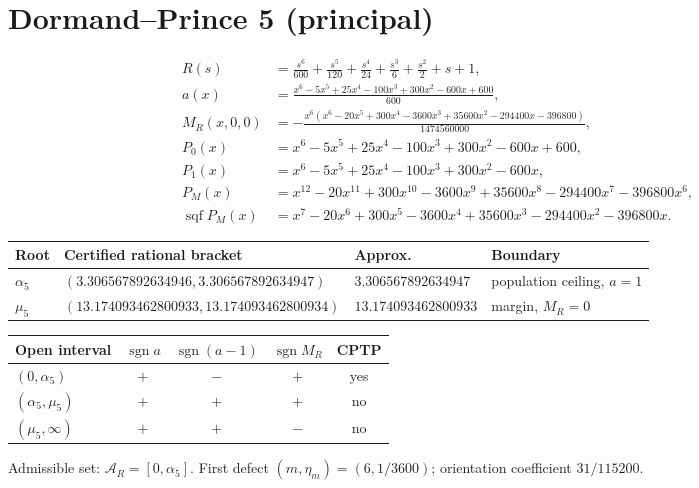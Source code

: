 \documentclass[11pt]{article}
\begin{document}
\section{Dormand--Prince 5 (principal)}
\begin{align*}
R(s)&=\frac{s^{6}}{600} + \frac{s^{5}}{120} + \frac{s^{4}}{24} + \frac{s^{3}}{6} + \frac{s^{2}}{2} + s + 1,\\
a(x)&=\frac{x^{6} - 5 x^{5} + 25 x^{4} - 100 x^{3} + 300 x^{2} - 600 x + 600}{600},\\
M_R(x,0,0)&=- \frac{x^{6} \left(x^{6} - 20 x^{5} + 300 x^{4} - 3600 x^{3} + 35600 x^{2} - 294400 x - 396800\right)}{1474560000},\\
P_0(x)&=x^{6}-5 x^{5}+25 x^{4}-100 x^{3}+300 x^{2}-600 x+600,\\
P_1(x)&=x^{6}-5 x^{5}+25 x^{4}-100 x^{3}+300 x^{2}-600 x,\\
P_M(x)&=x^{12}-20 x^{11}+300 x^{10}-3600 x^{9}+35600 x^{8}-294400 x^{7}-396800 x^{6},\\
\operatorname{sqf}P_M(x)&=x^{7}-20 x^{6}+300 x^{5}-3600 x^{4}+35600 x^{3}-294400 x^{2}-396800 x.
\end{align*}
\begin{center}
\begin{tabular}{@{}llll@{}}
\toprule
Root & Certified rational bracket & Approx. & Boundary \\
\midrule
$\alpha_5$ & $(3.306567892634946,3.306567892634947)$ & $3.306567892634947$ & population ceiling, $a=1$ \\
$\mu_5$ & $(13.174093462800933,13.174093462800934)$ & $13.174093462800933$ & margin, $M_R=0$ \\
\bottomrule
\end{tabular}
\end{center}
\begin{center}
\begin{tabular}{@{}lcccc@{}}
\toprule
Open interval & $\operatorname{sgn}a$ & $\operatorname{sgn}(a-1)$ & $\operatorname{sgn}M_R$ & CPTP \\
\midrule
$(0,\alpha_5)$ & $+$ & $-$ & $+$ & yes \\
$(\alpha_5,\mu_5)$ & $+$ & $+$ & $+$ & no \\
$(\mu_5,\infty)$ & $+$ & $+$ & $-$ & no \\
\bottomrule
\end{tabular}
\end{center}
Admissible set: $\mathcal A_R=[0,\alpha_5]$. First defect $(m,\eta_m)=(6,1/3600)$; orientation coefficient $31/115200$.
\end{document}
